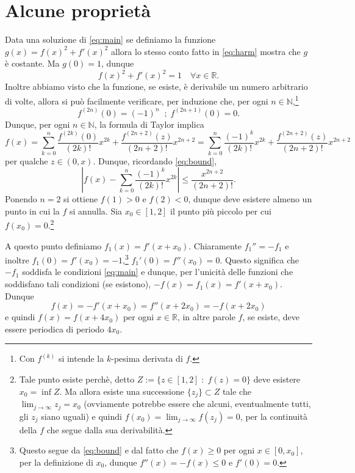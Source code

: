 \documentclass{amsart}
\numberwithin{equation}{section}
\newcommand\bN{{\mathbb N}}
\newcommand\bR{{\mathbb R}}
\begin{document}
\section{Alcune propriet\`a}
Data una soluzione di \eqref{eq:main} se definiamo la funzione $g(x)=f(x)^2+f'(x)^2$ allora lo stesso conto fatto in \eqref{eq:harm} mostra che $g$ \`e costante. Ma $g(0)=1$, dunque
\begin{equation}\label{eq:bound}
f(x)^2+f'(x)^2=1 \quad\forall x\in\bR.
\end{equation}
Inoltre abbiamo visto che la funzione, se esiste, \`e derivabile un numero arbitrario di volte, allora si pu\`o facilmente verificare, per induzione che, per ogni $n\in\bN$,\footnote{Con $f^{(k)}$ si intende la $k$-pesima derivata di $f$.}
\[
f^{(2n)}(0)=(-1)^n \;\;;\;f^{(2n+1)}(0)=0.
\]
Dunque, per ogni $n\in\bN$, la formula di Taylor implica
\[
f(x)=\sum_{k=0}^n\frac{f^{(2k)}(0)}{(2k)!}x^{2k}+\frac{f^{(2n+2)}(z)}{(2n+2)!}x^{2n+2}=
\sum_{k=0}^n\frac{(-1)^k}{(2k)!}x^{2k}+\frac{f^{(2n+2)}(z)}{(2n+2)!}x^{2n+2}
\]
per qualche $z\in (0,x)$.
Dunque, ricordando \eqref{eq:bound},
\begin{equation}\label{eq:bound2}
\left|f(x)-\sum_{k=0}^n\frac{(-1)^k}{(2k)!}x^{2k}\right|\leq \frac{x^{2n+2}}{(2n+2)!}.
\end{equation}
Ponendo $n=2$ si ottiene $f(1)>0$ e $f(2)<0$, dunque deve esistere almeno un punto in cui la $f$ si annulla. Sia $x_0\in [1,2]$ il punto pi\`u piccolo per cui $f(x_0)=0$.\footnote{Tale punto esiste perch\`e, detto $Z:=\{z\in [1,2]\;:\; f(z)=0\}$ deve esistere $x_0=\inf Z$. Ma allora esiste una successione $\{z_j\}\subset Z$ tale che $\lim_{j\to\infty} z_j=x_0$ (ovviamente potrebbe essere che  alcuni, eventualmente tutti, gli $z_j$ siano uguali) e quindi $f(x_0)=\lim_{j\to\infty}f(z_j)=0$, per la continuit\`a della $f$ che segue dalla sua derivabilit\`a.}

A questo punto definiamo $f_1(x)=f'(x+x_0)$. Chiaramente $f_1''=-f_1$ e inoltre $f_1(0)=f'(x_0)=-1$,\footnote{Questo segue da \eqref{eq:bound} e dal fatto che $f(x)\geq 0$ per ogni $x\in [0,x_0]$, per la definizione di $x_0$, dunque $f''(x)=-f(x)\leq 0$ e $f'(0)=0$.} $f_1'(0)=f''(x_0)=0$. Questo significa che $-f_1$ soddisfa le condizioni \eqref{eq:main} e dunque, per l'unicit\`a delle funzioni che soddisfano tali condizioni (se esistono), $-f(x)=f_1(x)=f'(x+x_0)$. Dunque 
\[
f(x)=-f'(x+x_0)=f''(x+2x_0)=-f(x+2x_0)
\]
e quindi $f(x)=f(x+4x_0)$ per ogni $x\in \bR$, in altre parole $f$, se esiste, deve essere periodica di periodo $4x_0$.
\end{document}
